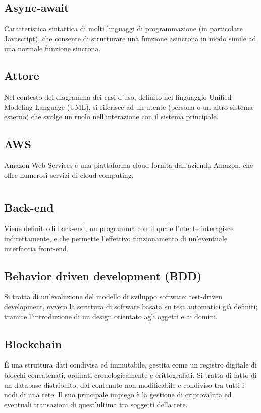 	\subsection*{Async-await}
	Caratteristica sintattica di molti linguaggi di programmazione (in particolare Javascript), che consente di strutturare una funzione asincrona in modo simile ad una normale funzione sincrona.
	\subsection*{Attore}
	Nel contesto del diagramma dei casi d’uso, definito nel linguaggio Unified Modeling Language (UML), si riferisce ad un utente (persona o un altro sistema esterno) che svolge un ruolo nell’interazione con il sistema principale.
	\subsection*{AWS}
	Amazon Web Services è una piattaforma cloud fornita dall’azienda Amazon, che offre numerosi servizi di cloud computing.
\pagebreak
\section[B]{}
	\subsection*{Back-end}
	Viene definito di back-end, un programma con il quale l’utente interagisce indirettamente, e che permette l’effettivo funzionamento di un’eventuale interfaccia front-end.
	\subsection*{Behavior driven development (BDD)}
	Si tratta di un’evoluzione del modello di sviluppo software: test-driven development, ovvero la scrittura di software basata su test automatici già definiti; tramite l’introduzione di un design orientato agli oggetti e ai domini.
	\subsection*{Blockchain}
	È una struttura dati condivisa ed immutabile, gestita come un registro digitale di blocchi concatenati, ordinati cronologicamente e crittografati. Si tratta di fatto di un database distribuito, dal contenuto non modificabile e condiviso tra tutti i nodi di una rete. Il suo principale impiego è la gestione di criptovaluta ed eventuali transazioni di quest’ultima tra soggetti della rete.
